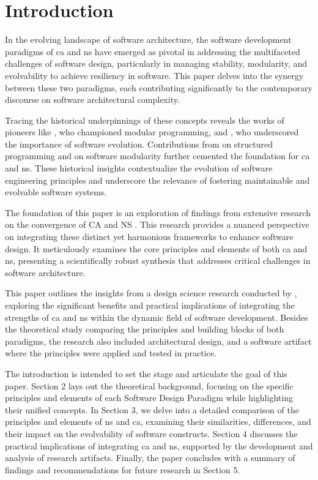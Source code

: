 \section{Introduction} \label{sec:introduction} 

In the evolving landscape of software architecture, the software development paradigms of
\gls{ca} and \gls{ns} have emerged as pivotal in addressing the multifaceted challenges of
software design, particularly in managing stability, modularity, and evolvability to
achieve resiliency in software. This paper delves into the synergy between these two
paradigms, each contributing significantly to the contemporary discourse on software
architectural complexity.

Tracing the historical underpinnings of these concepts reveals the works of pioneers like
\textcite{d_mcilroy_nato_1968}, who championed modular programming, and
\textcite{lehman_programs_1980}, who underscored the importance of software evolution.
Contributions from \textcite{dijkstra_letters_1968} on structured programming and
\textcite{parnas_criteria_1972} on software modularity further cemented the foundation for
\gls{ca} and \gls{ns}. These historical insights contextualize the evolution of software
engineering principles and underscore the relevance of fostering maintainable and
evolvable software systems.

The foundation of this paper is an exploration of findings from extensive research on
the convergence of CA and NS \cite{koks_convergence_2023}. This research provides a
nuanced perspective on integrating these distinct yet harmonious frameworks to enhance
software design. It meticulously examines the core principles and elements of both
\gls{ca} and \gls{ns}, presenting a scientifically robust synthesis that addresses
critical challenges in software architecture.

This paper outlines the insights from a design science research conducted by
, exploring the significant benefits and practical
implications of integrating the strengths of \gls{ca} and \gls{ns} within the dynamic
field of software development. Besides the theoretical study comparing the principles and
building blocks of both paradigms, the research also included architectural design, and a
software artifact where the principles were applied and tested in practice.  

The introduction is intended to set the stage and articulate the goal of this paper.
Section 2 lays out the theoretical background, focusing on the specific principles and
elements of each Software Design Paradigm while highlighting their unified concepts. In
Section 3, we delve into a detailed comparison of the principles and elements of \gls{ns} and
\gls{ca}, examining their similarities, differences, and their impact on the evolvability of
software constructs. Section 4 discusses the practical implications of integrating \gls{ca} and
\gls{ns}, supported by the development and analysis of research artifacts. Finally, the paper
concludes with a summary of findings and recommendations for future research in Section 5.